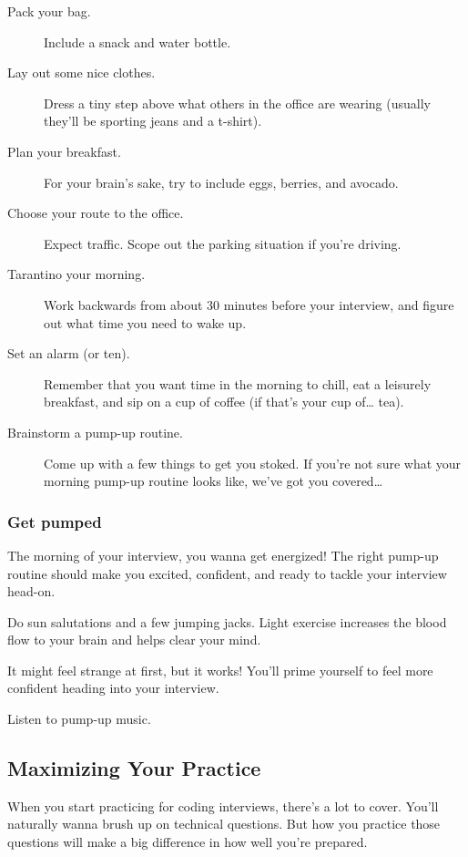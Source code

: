 \documentclass{article}
\begin{document}
\begin{description}

\item[Pack your bag.] Include a snack and water bottle.
\item[Lay out some nice clothes.] Dress a tiny step above what others in the office are wearing (usually they'll be sporting jeans and a t-shirt).
\item[Plan your breakfast.] For your brain's sake, try to include eggs, berries, and avocado.
\item[Choose your route to the office.] Expect traffic. Scope out the parking situation if you're driving.
\item[Tarantino your morning.] Work backwards from about 30 minutes before your interview, and figure out what time you need to wake up.
\item[Set an alarm (or ten).] Remember that you want time in the morning to chill, eat a leisurely breakfast, and sip on a cup of coffee (if that's your cup of… tea).
\item[Brainstorm a pump-up routine.] Come up with a few things to get you stoked. If you're not sure what your morning pump-up routine looks like, we've got you covered…
\end{description}


\subsubsection{Get pumped}

The morning of your interview, you wanna get energized! The right pump-up routine should make you excited, confident, and ready to tackle your interview head-on.

 Do sun salutations and a few jumping jacks. Light exercise increases the blood flow to your brain and helps clear your mind.

 It might feel strange at first, but it works! You'll prime yourself to feel more confident heading into your interview.

Listen to pump-up music. 



\subsection{Maximizing Your Practice}

When you start practicing for coding interviews, there’s a lot to cover. You’ll naturally wanna brush up on technical questions. But how you practice those questions will make a big difference in how well you’re prepared.
\end{document}
